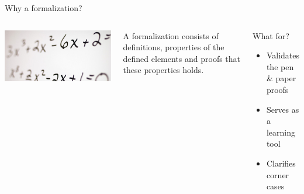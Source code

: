 \documentclass{beamer}
\begin{document}
\begin{frame}{Why a formalization?}
  \begin{columns}[c]
    \includegraphics[scale=0.13]{whiteboard_math.jpg}
    \begin{definition}
       A formalization consists of definitions, properties of the defined elements and proofs that
       these properties holds.
    \end{definition}
    \begin{block}{What for?}
      \begin{itemize}
        \item Validates the pen \& paper proofs
        \item Serves as a learning tool
        \item Clarifies corner cases
      \end{itemize}
    \end{block}
  \end{columns}
\end{frame}
\end{document}
